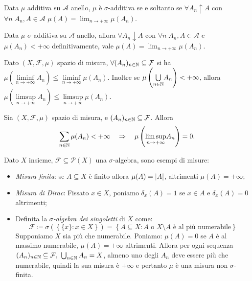 \begin{exercise}
	Data $\mu$ additiva su $\mathcal{A}$ anello, $\mu$ è $\sigma$-additiva se e soltanto se $\forall A_n \uparrow A$ con $\forall n\; A_n,A \in \mathcal{A}$ $\mu(A)=\lim_{n\to +\infty} \mu(A_n)$.
\end{exercise}
\begin{exercise}
	Data $\mu$ $\sigma$-additiva su $\mathcal{A}$ anello, allora $\forall A_n \downarrow A$ con $\forall n\; A_n,A \in \mathcal{A}$ e $\mu(A_n) < + \infty$ definitivamente, vale $\mu(A)=\lim_{n\rightarrow +\infty} \mu(A_n)$.
\end{exercise}
\begin{exercise}
	Dato $(X,\mathcal{F}, \mu)$ spazio di misura, $\forall (A_n)_{n\in\mathbb{N}}\subseteq\mathcal{F}$  si ha $\mu\left(\underset{n\rightarrow +\infty}{\liminf} A_n\right) \leq \underset{n\rightarrow +\infty}{\liminf} \mu (A_n)$. Inoltre se $\mu\left(\underset{n\in\mathbb{N}}{\bigcup} A_n \right) < +\infty$, allora $\mu\left(\underset{n\rightarrow +\infty}{\limsup} A_n\right) \leq \underset{n\rightarrow +\infty}{\limsup} \mu (A_n)$.
\end{exercise}
\begin{exercise}
	Sia $(X,\mathcal{F}, \mu)$ spazio di misura, e $ (A_n)_{n\in\mathbb{N}}\subseteq\mathcal{F}$. Allora 
    \[
        \sum_{n\in\mathbb{N}} \mu(A_n) < +\infty \quad \Rightarrow \quad   \mu\left({\limsup_{n\rightarrow +\infty}} A_n\right)=0.
    \]
\end{exercise}
\begin{example}
	Dato $X$ insieme, $\mathcal{F}\subseteq \mathscr{P}(X)$ una $\sigma$-algebra, sono esempi di misure:
	\begin{itemize}
		\item \emph{Misura finita}: se $A \subseteq X$ è finito allora $\mu(A)=\left|A\right|$, altrimenti $\mu(A)=+\infty$;
		\item \emph{Misura di Dirac}: Fissato $x\in X$, poniamo $ \delta_x(A) = 1 $ se $x\in A$ e $\delta_x(A)=0$ altrimenti;
		\item Definita la \emph{$\sigma$-algebra dei singoletti} di $ X $ come:
		\[ \mathcal{F} \coloneqq \sigma\left( \left\{ \{x\} : x\in X \right\} \right) = \left\{ A\subseteq X : A \text{ o } X\setminus A \text{ è al più numerabile} \right\} \]
		Supponiamo $ X $ sia più che numerabile. Poniamo: $ \mu(A) = 0 $ se $ A $ è al massimo numerabile, $ \mu(A) = +\infty $ altrimenti. 
		Allora per ogni sequenza $(A_n)_{n\in\N}\subseteq\mathcal{F},\ \bigcup_{n\in\N} A_n=X$, almeno uno degli $A_n$ deve essere più che numerabile, quindi la sua misura è $+\infty$ e pertanto $ \mu $ è una misura non $ \sigma $-finita.
	\end{itemize}
\end{example}


